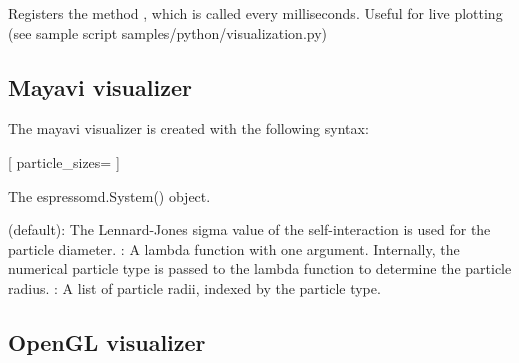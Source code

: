 Registers the method , which is called every  milliseconds.
Useful for live plotting (see sample script samples/python/visualization.py)

\subsection{Mayavi visualizer}

The mayavi visualizer is created with the following syntax:

\begin{pysyntax}
  [
    particle_sizes=
  ]
\end{pysyntax}

\begin{arguments}
\item[\var{system}] The espressomd.System() object.
\item[\opt{particle_sizes}] 
 (default): The Lennard-Jones sigma value of the self-interaction 
is used for the particle diameter. 
: A lambda function with one argument. Internally, the numerical 
particle type is passed to the lambda function to determine the particle radius. 
: A list of particle radii, indexed by the particle type.
\end{arguments}

\subsection{OpenGL visualizer}

